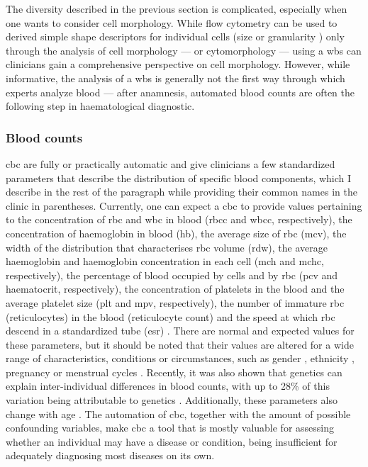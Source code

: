 The diversity described in the previous section is complicated, especially when one wants to consider cell morphology. While flow cytometry can be used to derived simple shape descriptors for individual cells (size or granularity \cite{Shapiro2005-ud}) only through the analysis of cell morphology --- or cytomorphology --- using a \ac{wbs} can clinicians gain a comprehensive perspective on cell morphology. However, while informative, the analysis of a \ac{wbs} is generally not the first way through which experts analyze blood --- after anamnesis, automated blood counts are often the following step in haematological diagnostic.

\subsubsection{Blood counts}

\Ac{cbc} are fully or practically automatic and give clinicians a few standardized parameters that describe the distribution of specific blood components, which I describe in the rest of the paragraph while providing their common names in the clinic in parentheses. Currently, one can expect a \ac{cbc} to provide values pertaining to the concentration of \ac{rbc} and \ac{wbc} in blood (\ac{rbcc} and \ac{wbcc}, respectively), the concentration of haemoglobin in blood (\ac{hb}), the average size of \ac{rbc} (\ac{mcv}), the width of the distribution that characterises \ac{rbc} volume (\ac{rdw}), the average haemoglobin and haemoglobin concentration in each cell (\ac{mch} and \ac{mchc}, respectively), the percentage of blood occupied by cells and by \ac{rbc} (\ac{pcv} and haematocrit, respectively), the concentration of platelets in the blood and the average platelet size (\ac{plt} and \ac{mpv}, respectively), the number of immature \ac{rbc} (reticulocytes) in the blood (reticulocyte count) and the speed at which \ac{rbc} descend in a standardized tube (\ac{esr}) \cite{Bain2014-oc,Evans1991-ri}. There are normal and expected values for these parameters, but it should be noted that their values are altered for a wide range of characteristics, conditions or circumstances, such as gender \cite{Tong2019-eq,Guillet1998-hw}, ethnicity \cite{Lee2019-pr,Tong2019-eq}, pregnancy \cite{England1976-ff} or menstrual cycles \cite{Guillet1998-hw}. Recently, it was also shown that genetics can explain inter-individual differences in blood counts, with up to 28\% of this variation being attributable to genetics \cite{Vuckovic2020-eh}. Additionally, these parameters also change with age \cite{Kubota1991-at,Mahlknecht2010-mo,Siemons2014-wa}. The automation of \ac{cbc}, together with the amount of possible confounding variables, make \ac{cbc} a tool that is mostly valuable for assessing whether an individual may have a disease or condition, being insufficient for adequately diagnosing most diseases on its own.

